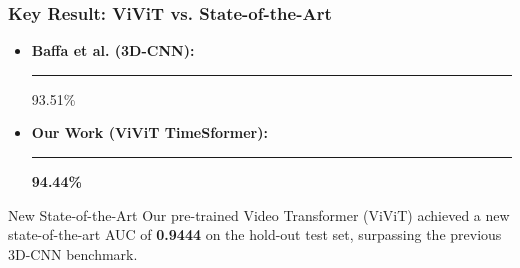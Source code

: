 \documentclass{beamer}
\begin{document}
\begin{frame}
  \frametitle{Key Result: ViViT vs. State-of-the-Art}
  \vspace{1em}
  \begin{itemize}
    \item \textbf{Baffa et al. \cite{DeMatheus2023} (3D-CNN):}
      \textcolor{structure}{\rule{0.9351\linewidth}{12pt}} \hspace{0.5em} 93.51\%
    \item \textbf{Our Work (ViViT TimeSformer):}
      \textcolor{myteal}{\rule{0.9444\linewidth}{12pt}} \hspace{0.5em} \textbf{94.44\%}
  \end{itemize}

  \vspace{1em}
  \begin{alertblock}{New State-of-the-Art}
    Our pre-trained Video Transformer (ViViT) achieved a new state-of-the-art AUC of \textbf{0.9444} on the hold-out test set, surpassing the previous 3D-CNN benchmark.
  \end{alertblock}
\end{frame}

\end{document}
